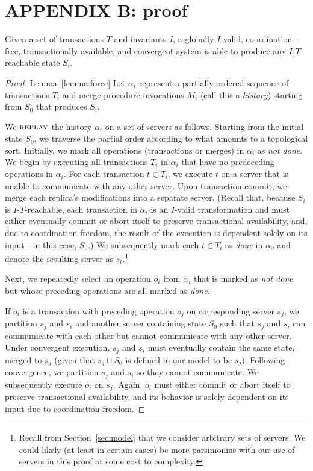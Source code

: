 \section*{APPENDIX B: \iconfluence proof}

\begin{lemma}\label{lemma:force} 
Given a set of transactions $T$ and invariants $I$, a globally $I$-valid, coordination-free, transactionally available, and convergent system is able to produce any $I$-$T$-reachable state $S_i$.
 \end{lemma} \begin{proof}{Lemma~\ref{lemma:force}}
Let $\alpha_i$ represent a partially ordered sequence of transactions $T_i$ and merge procedure invocations $M_i$ (call this a \textit{history}) starting from $S_0$ that produces $S_i$,

We $\textsc{replay}$ the history $\alpha_i$ on a set of servers as follows. Starting from the initial state $S_0$, we traverse the partial order according to what amounts to a topological sort. Initially, we mark all operations (transactions or merges) in $\alpha_i$ as \textit{not done}. We begin by executing all transactions $T_i$ in $\alpha_i$ that have no predeceding operations in $\alpha_i$. For each transaction $t \in T_i$, we execute $t$ on a server that is unable to communicate with any other server. Upon transaction commit, we merge each replica's modifications into a separate server.  (Recall that, because $S_i$ is $I$-$T$-reachable, each transaction in $\alpha_i$ is an $I$-valid transformation and must either eventually commit or abort itself to preserve transactional availability, and, due to coordination-freedom, the result of the execution is dependent solely on its input---in this case, $S_0$.) We subsequently mark each $t \in T_i$ as \textit{done} in $\alpha_0$ and denote the resulting server as $s_t$.\footnote{Recall from Section~\ref{sec:model} that we consider arbitrary sets of servers. We could likely (at least in certain cases) be more parsimonius with our use of servers in this proof at some cost to complexity.} 

Next, we repeatedly select an operation $o_i$ from $\alpha_i$ that is marked as \textit{not done} but whose preceding operations are all marked as \textit{done}.

If $o_i$ is a transaction with preceding operation $o_j$ on corresponding server $s_j$, we partition $s_j$ and $s_i$ and another server containing state $S_0$ such that $s_j$ and $s_i$ can communicate with each other but cannot communicate with any other server. Under convergent execution, $s_j$ and $s_i$ must eventually contain the same state, merged to $s_j$ (given that $s_j \sqcup S_0$ is defined in our model to be $s_j$). Following convergence, we partition $s_j$ and $s_i$ so they cannot communicate. We subsequently execute $o_i$ on $s_j$. Again, $o_i$ must either commit or abort itself to preserve transactional availability, and its behavior is solely dependent on its input due to coordination-freedom.


\end{proof}
